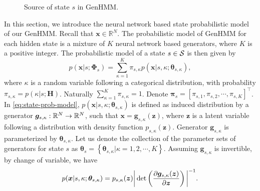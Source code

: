 \documentclass{ecai}
\begin{document}
\begin{figure}[!t]
  \centering
  \caption{Source of state $s$ in GenHMM.}
  \label{fig:gen-mix}
  \vspace{0.3cm}
\end{figure}

In this section, we introduce the neural network based state probabilistic model of our GenHMM.
Recall that $\bm{x}\in\mathbb{R}^N$.
The probabilistic model of GenHMM for each hidden state is a mixture of $K$ neural network based generators, where $K$ is a positive integer.
The probabilistic model of a state $s\in\mathcal{S}$ is then given by
\begin{equation}\label{eq:state-prob-model}
  p(\bm{x}| s; \bm{\Phi}_{s}) = \sum_{\kappa=1}^{K}\pi_{s, \kappa} p(\bm{x}| s, \kappa; \bm{\theta}_{s, \kappa}),
\end{equation}
where $\kappa$ is a random variable following a categorical distribution, with probability $\pi_{s, \kappa} = p(\kappa | s; \bm{H})$.
Naturally $\sum_{\kappa = 1}^{K} \pi_{s, \kappa}= 1$. Denote $\bm{\pi}_{s} = [\pi_{s,1}, \pi_{s,2}, \cdots, \pi_{s,K}]^{\intercal}$. 
In \eqref{eq:state-prob-model}, $p(\bm{x}| s, \kappa; \bm{\theta}_{s, \kappa})$ is defined as induced distribution by a generator $\bm{g}_{s,\kappa}: \mathbb{R}^{N}\rightarrow\mathbb{R}^{N}$, such that $\bm{x}=\bm{g}_{s, \kappa}(\bm{z})$, where $\bm{z}$ is a latent variable following a distribution with density function $p_{s,\kappa}(\bm{z})$. Generator $\bm{g}_{s,\kappa}$ is parameterized by $\bm{\theta}_{s, \kappa}$. Let us denote the collection of the parameter sets of generators for state $s$ as $\bm{\theta}_s = \left\{ \bm{\theta}_{s, \kappa}| \kappa = 1, 2, \cdots, K \right\}$. Assuming $\bm{g}_{s, \kappa}$ is invertible, by change of variable, we have
\begin{equation}\label{eq:changel-variable}
  p(\bm{x}| s, \kappa; \bm{\theta}_{s, \kappa}) = p_{s,\kappa}(\bm{z})\bigg| \det\left( \frac{ \partial \bm{g}_{s,\kappa}(\bm{z})}{\partial \bm{z}} \right)\bigg|^{-1}.
\end{equation}
\end{document}
